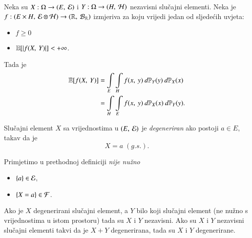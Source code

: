 \begin{zad} \label{zad:7.10}
    Neka su $X : \Omega \to ({E}, \: {\mathcal{E}})$ i $Y : \Omega \to ({H}, \: {\mathcal{H}})$ nezavisni slu\v cajni elementi.
    Neka je $f : ({E \times H}, \: {\mathcal{E} \otimes \mathcal{H}}) \to ({\mathbb{R}}, \: {\mathcal{B}_{\mathbb{R}}})$ izmjeriva za koju vrijedi jedan od sljede\' cih uvjeta:
    \begin{itemize}
        \item $f \geq 0$
        \item $\mathbb{E} [|f ({X}, \: {Y})|] < +\infty$.
    \end{itemize}
    Tada je
    \begin{align*}
        \mathbb{E} [ f ({X}, \: {Y}) ]
        &= \int\limits_{E} \int\limits_{H} f ({x}, \: {y}) \: d \mathbb{P}_Y (y) \: d \mathbb{P}_X (x) \\
        &= \int\limits_H \int\limits_E f ({x}, \: {y}) \: d \mathbb{P}_X (x) \: d \mathbb{P}_Y (y).
    \end{align*}
\end{zad}

\begin{defn}    \label{defn:7.10-1}
    Slu\v cajni element $X$ sa vrijednostima u $({E}, \: {\mathcal{E}})$ je \emph{degeneriran} ako postoji $a \in E$, takav da je
    \begin{equation*}
        X = a \; (g.s.).
    \end{equation*}
\end{defn}

Primjetimo u prethodnoj definiciji \emph{nije nu\v zno}
\begin{itemize}
    \item[] $\{a\} \in \mathcal{E}$,
    \item[] $\{X = a\} \in \mathcal{F}$.
\end{itemize}

\begin{zad} \label{zad:7.11}
    Ako je $X$ degenerirani slu\v cajni element, a $Y$ bilo koji slu\v cajni element (ne nu\v zno s vrijednostima u istom prostoru) tada su $X$ i $Y$ nezavisni.
    Ako su $X$ i $Y$ nezavisni slu\v cajni elementi takvi da je $X + Y$ degenerirana, tada su $X$ i $Y$ degenerirane.
\end{zad}

